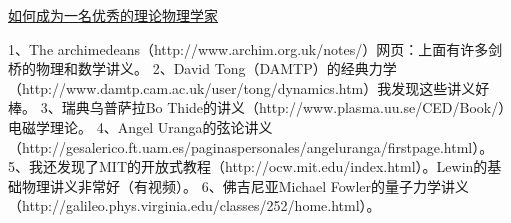 
\href{https://xialab.pku.edu.cn/kytdyw1/zdylm.m.jsp?wbtreeid=1011&tstreeid=11956&_t_uid=2945&language=en&homepageuuid=BF649325C5584FC683CE0B601D21AC65&templateuuid=4CC182410BA14FF8B55ED726FB2087FB&producttype=0&_tmode_=99&tsitesapptype=zdylm}{如何成为一名优秀的理论物理学家}

1、The archimedeans（http://www.archim.org.uk/notes/）网页：上面有许多剑桥的物理和数学讲义。
2、David Tong（DAMTP）的经典力学（http://www.damtp.cam.ac.uk/user/tong/dynamics.htm）我发现这些讲义好棒。
3、瑞典乌普萨拉Bo Thide的讲义（http://www.plasma.uu.se/CED/Book/）电磁学理论。
4、Angel Uranga的弦论讲义（http://gesalerico.ft.uam.es/paginaspersonales/angeluranga/firstpage.html）。
5、我还发现了MIT的开放式教程（http://ocw.mit.edu/index.html）。Lewin的基础物理讲义非常好（有视频）。
6、佛吉尼亚Michael Fowler的量子力学讲义（http://galileo.phys.virginia.edu/classes/252/home.html）。
